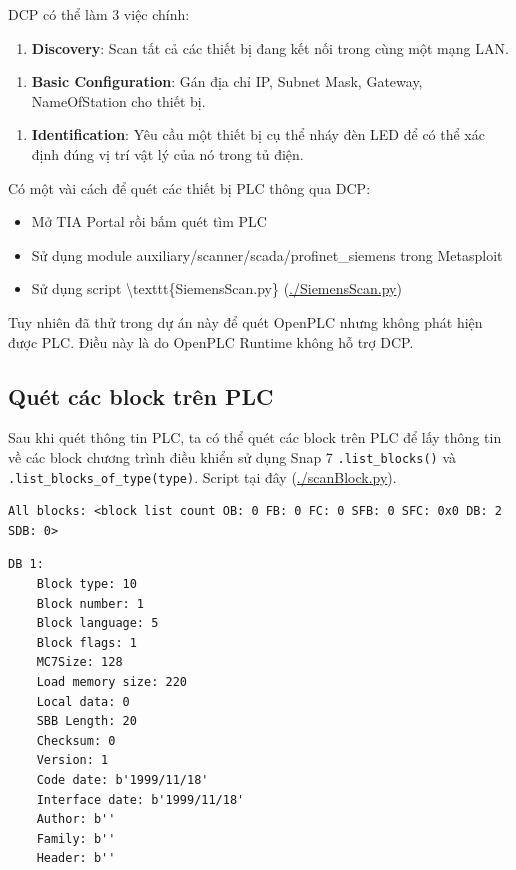 \documentclass[../main.tex]{subfiles}
\begin{document}
\begin{enumerate}
DCP có thể làm 3 việc chính:

\begin{enumerate}
    \item \textbf{Discovery}: Scan tất cả các thiết bị đang kết nối trong cùng một mạng LAN.
\end{enumerate}


\begin{enumerate}
    \item \textbf{Basic Configuration}: Gán địa chỉ IP, Subnet Mask, Gateway, NameOfStation cho thiết bị.
\end{enumerate}


\begin{enumerate}
    \item \textbf{Identification}: Yêu cầu một thiết bị cụ thể nháy đèn LED để có thể xác định đúng vị trí vật lý của nó trong tủ điện.
\end{enumerate}


Có một vài cách để quét các thiết bị PLC thông qua DCP:


\begin{itemize}
    \item Mở TIA Portal rồi bấm quét tìm PLC
    \item Sử dụng module auxiliary/scanner/scada/profinet\_siemens trong Metasploit
    \item Sử dụng script \textbackslash{}texttt\{SiemensScan.py\} (\url{./SiemensScan.py})
\end{itemize}


Tuy nhiên đã thử trong dự án này để quét OpenPLC nhưng không phát hiện được PLC. Điều  này là do OpenPLC Runtime không hỗ trợ DCP.


\subsection{Quét các block trên PLC}


Sau khi quét thông tin PLC, ta có thể quét các block trên PLC để lấy thông tin về các block chương trình điều khiển sử dụng Snap 7 \texttt{.list\_blocks()} và \texttt{.list\_blocks\_of\_type(type)}. Script tại đây (\url{./scanBlock.py}).


\begin{verbatim}
All blocks: <block list count OB: 0 FB: 0 FC: 0 SFB: 0 SFC: 0x0 DB: 2 SDB: 0>
\end{verbatim}


\begin{verbatim}
DB 1:
    Block type: 10
    Block number: 1
    Block language: 5
    Block flags: 1
    MC7Size: 128
    Load memory size: 220        
    Local data: 0
    SBB Length: 20
    Checksum: 0
    Version: 1
    Code date: b'1999/11/18'
    Interface date: b'1999/11/18'
    Author: b''
    Family: b''
    Header: b''


\end{verbatim}
\end{enumerate}
\end{document}
